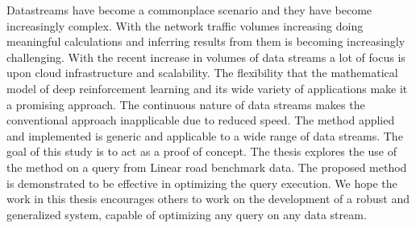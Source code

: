 Datastreams have become a commonplace scenario and they have become increasingly complex. With the network traffic volumes increasing doing meaningful calculations and inferring results from them is becoming increasingly challenging. With the recent increase in volumes of data streams a lot of focus is upon cloud infrastructure and scalability. The flexibility that the mathematical model of deep reinforcement learning and its wide variety of applications make it a promising approach. The continuous nature of data streams makes the conventional approach inapplicable due to reduced speed. The method applied and implemented is generic and applicable to a wide range of data streams. The goal of this study is to act as a proof of concept. The thesis explores the use of the method on a query from Linear road benchmark data. The proposed method is demonstrated to be effective in optimizing the query execution. We hope the work in this thesis encourages others to work on the development of a robust and generalized system, capable of optimizing any query on any data stream.

